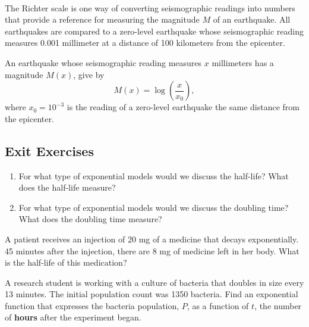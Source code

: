\begin{myDefinition}~\\[0.5mm]
The Richter scale is one way of converting seismographic readings into numbers that provide a reference for measuring the magnitude $M$ of an earthquake.  All earthquakes are compared to a zero-level earthquake whose seismographic reading measures 0.001 millimeter at a distance of 100 kilometers from the epicenter.  

An earthquake whose seismographic reading measures $x$ millimeters has a magnitude $M(x)$, give by $$M(x)=\log\left(\dfrac{x}{x_0}\right),$$ where $x_0=10^{-3}$ is the reading of a zero-level earthquake the same distance from the epicenter.\\
\end{myDefinition}



 \newpage

\subsection*{Exit Exercises} \label{exit-exponential-and-logarithmic-models}

\begin{myExit}
	\begin{enumerate}
		\item For what type of exponential models would we discuss the half-life?  What does the half-life measure?
		\vfill
		\item For what type of exponential models would we discuss the doubling time?  What does the doubling time measure?
		\vfill
	\end{enumerate}
\end{myExit}


\begin{myExit}
A patient receives an injection of 20 mg of a medicine that decays exponentially.  45 minutes after the injection, there are 8 mg of medicine left in her body.   What is the half-life of this medication?
\vfill
\vfill
\end{myExit}

\begin{myExit}
A research student is working with a culture of bacteria that doubles in size every 13 minutes.  The initial population count was 1350 bacteria.  Find an exponential function that expresses the bacteria population, $P$, as a function of $t$, the number of {\bf hours} after the experiment began.
\vfill
\vfill
\end{myExit}







